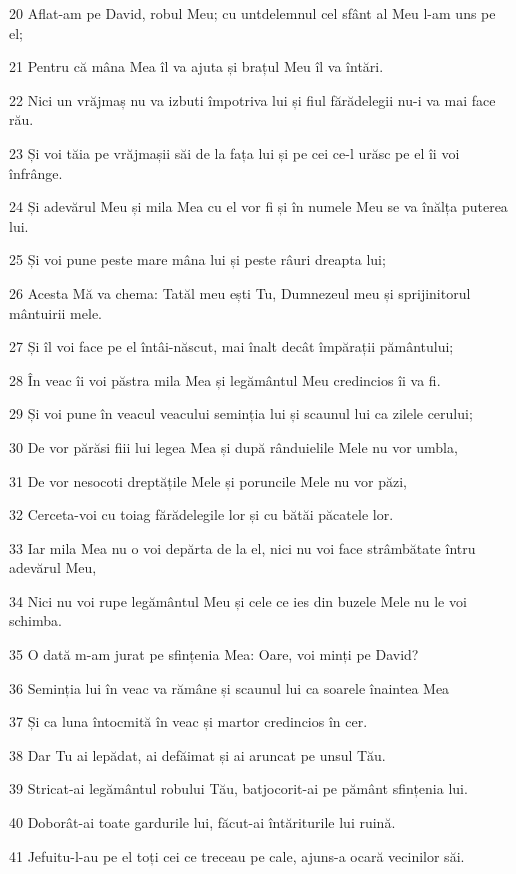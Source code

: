 \par 20 Aflat-am pe David, robul Meu; cu untdelemnul cel sfânt al Meu l-am uns pe el;
\par 21 Pentru că mâna Mea îl va ajuta și brațul Meu îl va întări.
\par 22 Nici un vrăjmaș nu va izbuti împotriva lui și fiul fărădelegii nu-i va mai face rău.
\par 23 Și voi tăia pe vrăjmașii săi de la fața lui și pe cei ce-l urăsc pe el îi voi înfrânge.
\par 24 Și adevărul Meu și mila Mea cu el vor fi și în numele Meu se va înălța puterea lui.
\par 25 Și voi pune peste mare mâna lui și peste râuri dreapta lui;
\par 26 Acesta Mă va chema: Tatăl meu ești Tu, Dumnezeul meu și sprijinitorul mântuirii mele.
\par 27 Și îl voi face pe el întâi-născut, mai înalt decât împărații pământului;
\par 28 În veac îi voi păstra mila Mea și legământul Meu credincios îi va fi.
\par 29 Și voi pune în veacul veacului seminția lui și scaunul lui ca zilele cerului;
\par 30 De vor părăsi fiii lui legea Mea și după rânduielile Mele nu vor umbla,
\par 31 De vor nesocoti dreptățile Mele și poruncile Mele nu vor păzi,
\par 32 Cerceta-voi cu toiag fărădelegile lor și cu bătăi păcatele lor.
\par 33 Iar mila Mea nu o voi depărta de la el, nici nu voi face strâmbătate întru adevărul Meu,
\par 34 Nici nu voi rupe legământul Meu și cele ce ies din buzele Mele nu le voi schimba.
\par 35 O dată m-am jurat pe sfințenia Mea: Oare, voi minți pe David?
\par 36 Seminția lui în veac va rămâne și scaunul lui ca soarele înaintea Mea
\par 37 Și ca luna întocmită în veac și martor credincios în cer.
\par 38 Dar Tu ai lepădat, ai defăimat și ai aruncat pe unsul Tău.
\par 39 Stricat-ai legământul robului Tău, batjocorit-ai pe pământ sfințenia lui.
\par 40 Doborât-ai toate gardurile lui, făcut-ai întăriturile lui ruină.
\par 41 Jefuitu-l-au pe el toți cei ce treceau pe cale, ajuns-a ocară vecinilor săi.
